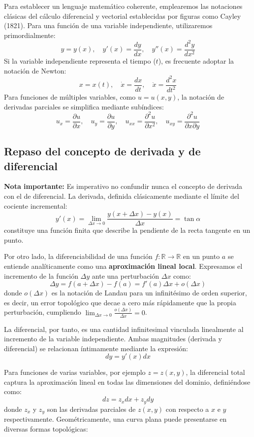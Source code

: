 \documentclass[11pt,a4paper]{article}
\theoremstyle{definition}
\theoremstyle{plain}
\begin{document}
Para establecer un lenguaje matemático coherente, emplearemos las notaciones clásicas del cálculo diferencial y vectorial establecidas por figuras como Cayley (1821).
Para una función de una variable independiente, utilizaremos primordialmente:
$$ y = y(x), \quad y'(x) = \frac{dy}{dx}, \quad y''(x) = \frac{d^2y}{dx^2} $$
Si la variable independiente representa el tiempo ($t$), es frecuente adoptar la notación de Newton:
$$ x = x(t), \quad \dot{x} = \frac{dx}{dt}, \quad \ddot{x} = \frac{d^2x}{dt^2} $$
Para funciones de múltiples variables, como $u = u(x,y)$, la notación de derivadas parciales se simplifica mediante subíndices:
$$ u_x = \frac{\partial u}{\partial x}, \quad u_y = \frac{\partial u}{\partial y}, \quad u_{xx} = \frac{\partial^2 u}{\partial x^2}, \quad u_{xy} = \frac{\partial^2 u}{\partial x \partial y} $$

\subsection{Repaso del concepto de derivada y de diferencial}

\textbf{Nota importante:} Es imperativo no confundir nunca el concepto de derivada con el de diferencial. La derivada, definida clásicamente mediante el límite del cociente incremental:
$$ y'(x) = \lim_{\Delta x \to 0} \frac{y(x + \Delta x) - y(x)}{\Delta x} = \tan \alpha $$
constituye una función finita que describe la pendiente de la recta tangente en un punto.

Por otro lado, la diferenciabilidad de una función $f: \mathbb{R} \to \mathbb{R}$ en un punto $a$ se entiende analíticamente como una \textbf{aproximación lineal local}. Expresamos el incremento de la función $\Delta y$ ante una perturbación $\Delta x$ como:
$$ \Delta y = f(a + \Delta x) - f(a) = f'(a)\Delta x + o(\Delta x) $$
donde $o(\Delta x)$ es la notación de Landau para un infinitésimo de orden superior, es decir, un error topológico que decae a cero más rápidamente que la propia perturbación, cumpliendo $\lim_{\Delta x \to 0} \frac{o(\Delta x)}{\Delta x} = 0$. 

La diferencial, por tanto, es una cantidad infinitesimal vinculada linealmente al incremento de la variable independiente. Ambas magnitudes (derivada y diferencial) se relacionan íntimamente mediante la expresión:
$$ dy = y'(x) dx $$

Para funciones de varias variables, por ejemplo $z = z(x,y)$, la diferencial total captura la aproximación lineal en todas las dimensiones del dominio, definiéndose como:
$$ dz = z_x dx + z_y dy $$
donde $z_x$ y $z_y$ son las derivadas parciales de $z(x,y)$ con respecto a $x$ e $y$ respectivamente. Geométricamente, una curva plana puede presentarse en diversas formas topológicas:
\end{document}
